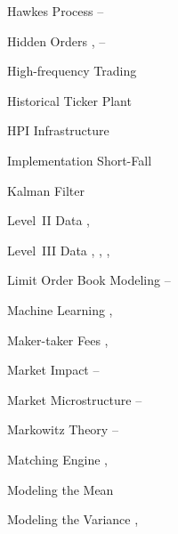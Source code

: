 \begin{multicols}{2}
{Hawkes Process \hfill \pageref{in:hawk1}--\pageref{in:hawk2} \par

Hidden Orders \hfill \pageref{in:hidden1}, \pageref{in:hidden2}--\pageref{in:hidden3} \par

High-frequency Trading \hfill \pageref{in:higheff} \par

Historical Ticker Plant \hfill \pageref{in:hist_tick_plant} \par

HPI Infrastructure \hfill \pageref{in:hpi} \par

Implementation Short-Fall \hfill \pageref{in:shortfall} \par

Kalman Filter \hfill \pageref{in:kalman} \par

Level~II Data \hfill \pageref{in:level2dat1}, \pageref{in:level2dat2} \par

Level~III Data \hfill \pageref{in:level3dat1}, \pageref{in:level3dat2}, \pageref{in:level3dat3}, \pageref{in:level3dat4} \par

Limit Order Book Modeling \hfill \pageref{in:labmod1}--\pageref{in:labmod2} \par 

Machine Learning \hfill \pageref{in:machine1}, \pageref{in:machine2} \par

Maker-taker Fees \hfill \pageref{in:takerfee1}, \pageref{in:takerfee2} \par

Market Impact \hfill \pageref{in:impact1}--\pageref{in:impact2} \par

Market Microstructure \hfill \pageref{in:micro1}--\pageref{in:micro2} \par

Markowitz Theory \hfill \pageref{in:mark1}--\pageref{in:mark2} \par

Matching Engine \hfill \pageref{in:matcheng1}, \pageref{in:matcheng2} \par

Modeling the Mean \hfill \pageref{in:modelmean} \par

Modeling the Variance \hfill \pageref{in:modelvar1}, \pageref{in:modelvar2} \par

}
\end{multicols}
